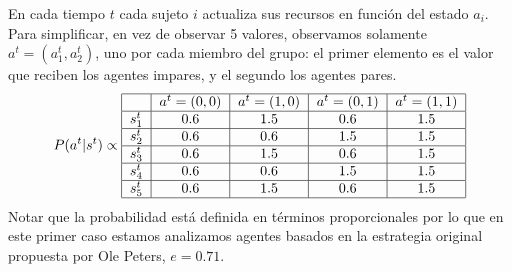 \documentclass[a4paper,10pt]{article}
\begin{document}
%
En cada tiempo $t$ cada sujeto $i$ actualiza sus recursos en función del estado $a_i$.
Para simplificar, en vez de observar 5 valores, observamos solamente $a^t=(a^t_1, a^t_2)$, uno por cada miembro del grupo: el primer elemento es el valor que reciben los agentes impares, y el segundo los agentes pares. 
%
\begin{align}
\centering
P(a^{t}|s^{t}) \propto \begin{tabular}{|c|c|c|c|c|c|c|}
        \hline
        & $a^t=(0,0)$ & $a^t=(1,0)$ & $a^t=(0,1)$ &  $a^t=(1,1)$  \\ \hline
       $s^{t}_1$ & $0.6$ & $1.5$ & $0.6$ & $1.5$ \\ \hline
       $s^{t}_2$ & $0.6$ & $0.6$ & $1.5$ & $1.5$  \\ \hline
       $s^{t}_3$ & $0.6$ & $1.5$ & $0.6$ & $1.5$  \\ \hline
       $s^{t}_4$ & $0.6$ & $0.6$ & $1.5$ & $1.5$ \\ \hline
       $s^{t}_5$ & $0.6$ & $1.5$ & $0.6$ & $1.5$ \\ \hline
\end{tabular}
\end{align}
Notar que la probabilidad está definida en términos proporcionales por lo que en este primer caso estamos analizamos agentes basados en la estrategia original propuesta por Ole Peters, $e=0.71$.

\end{document}
